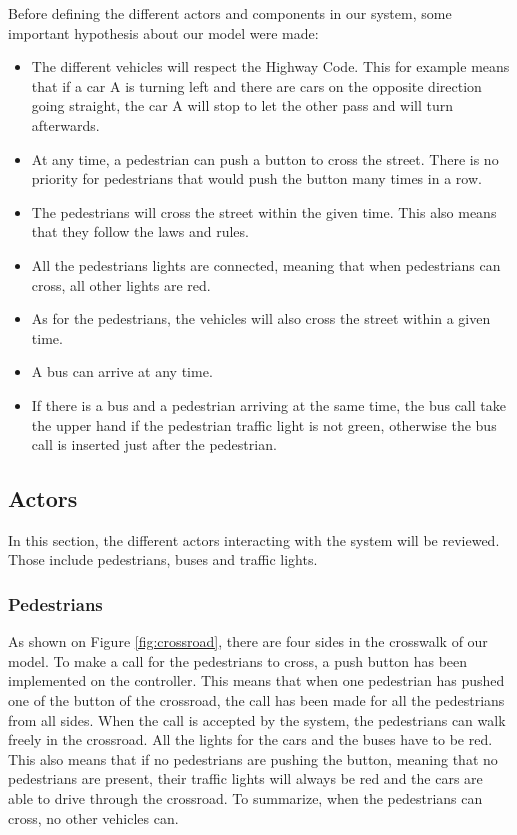 Before defining the different actors and components in our system, some important hypothesis about our model were made:
\begin{itemize}
    \item The different vehicles will respect the Highway Code. This for example means that if a car A is turning left and there are cars on the opposite direction going straight, the car A will stop to let the other pass and will turn afterwards.
    \item At any time, a pedestrian can push a button to cross the street. There is no priority for pedestrians that would push the button many times in a row.
    \item The pedestrians will cross the street within the given time. This also means that they follow the laws and rules.
    \item All the pedestrians lights are connected, meaning that when pedestrians can cross, all other lights are red.
    \item As for the pedestrians, the vehicles will also cross the street within a given time.
    \item A bus can arrive at any time.
    \item If there is a bus and a pedestrian arriving at the same time, the bus call take the upper hand if the pedestrian traffic light is not green, otherwise the bus call is inserted just after the pedestrian.
\end{itemize}

\subsection{Actors}
In this section, the different actors interacting with the system will be reviewed. Those include pedestrians, buses and traffic lights.

\subsubsection{Pedestrians}
As shown on Figure \ref{fig:crossroad}, there are four sides in the crosswalk of our model. To make a call for the pedestrians to cross, a push button has been implemented on the controller. This means that when one pedestrian has pushed one of the button of the crossroad, the call has been made for all the pedestrians from all  sides. When the call is accepted by the system, the pedestrians can walk freely in the crossroad. All the lights for the cars and the buses have to be red. This also means that if no pedestrians are pushing the button, meaning that no pedestrians are present, their traffic lights will always be red and the cars are able to drive through the crossroad.
To summarize, when the pedestrians can cross, no other vehicles can. 

